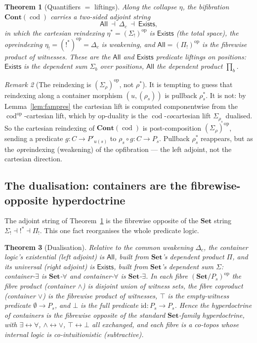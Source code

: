 \documentclass[11pt]{amsart}
\theoremstyle{plain}
\newtheorem{theorem}{Theorem}[section]
\theoremstyle{definition}
\theoremstyle{remark}
\newtheorem{remark}[theorem]{Remark}
\newcommand{\Set}{\mathbf{Set}}
\newcommand{\Cont}{\mathbf{Cont}}
\newcommand{\op}{\mathrm{op}}
\newcommand{\id}{\mathrm{id}}
\newcommand{\prodd}{\textstyle\prod}
\DeclareMathOperator{\cod}{cod}
\newcommand{\Exists}{\mathsf{Exists}}
\newcommand{\All}{\mathsf{All}}
\begin{document}
\begin{theorem}[Quantifiers $=$ liftings]\label{thm:quantAE}
Along the collapse $\eta$, the bifibration $\Cont(\cod)$ carries a two-sided adjoint string
\[
\All\ \dashv\ \Delta_c\ \dashv\ \Exists,
\]
in which the cartesian reindexing $\eta^*=(\Sigma_{!})^\op$ is $\Exists$ (the total space), the
opreindexing $\eta_!=({!}^*)^\op=\Delta_c$ is
weakening, and $\All=(\Pi_{!})^\op$ is the fibrewise product of witnesses. These are the
$\All$ and $\Exists$ predicate liftings on positions: $\Exists$ is the dependent
sum $\Sigma_{b}$ over positions, $\All$ the dependent product $\prodd_{b}$.
\end{theorem}

\begin{remark}[The reindexing is $(\Sigma_\rho)^\op$, not $\rho^*$]\label{rem:trap}
It is tempting to guess that reindexing along a container morphism
$(u,(\rho_s))$ is pullback $\rho_s^*$. It is not: by Lemma~\ref{lem:fampres} the cartesian lift is
computed component\-wise from the $\cod^\op$-cartesian lift, which by op-duality is the
$\cod$-\emph{co}cartesian lift $\Sigma_{\rho_s}$ dualised. So the cartesian reindexing of
$\Cont(\cod)$ is post-composition $(\Sigma_\rho)^\op$, sending a predicate $g\colon C\to P'_{u(s)}$ to
$\rho_s\circ g\colon C\to P_s$. Pullback $\rho_s^*$ reappears, but as the \emph{op}reindexing
(weakening) of the opfibration --- the left adjoint, not the cartesian direction.
\end{remark}

\subsection{The dualisation: containers are the fibrewise-opposite hyperdoctrine}\label{ss:dual}
The adjoint string of Theorem~\ref{thm:quantAE} is the fibrewise opposite of the $\Set$ string
$\Sigma_{!}\dashv{!}^*\dashv\Pi_{!}$. This one fact reorganises the whole predicate logic.

\begin{theorem}[Dualisation]\label{thm:dualisation}
Relative to the common weakening $\Delta_c$, the container logic's existential (left adjoint) is
$\All$, built from $\Set$'s dependent \emph{product} $\Pi$, and its universal (right adjoint) is
$\Exists$, built from $\Set$'s dependent \emph{sum} $\Sigma$: container-$\exists$ is $\Set$-$\forall$
and container-$\forall$ is $\Set$-$\exists$. In each fibre $(\Set/P_s)^\op$ the fibre product
(container $\wedge$) is disjoint union of witness sets, the fibre coproduct (container $\vee$) is the
fibrewise product of witnesses, $\top$ is the empty-witness predicate $\emptyset\to P_s$, and $\bot$
is the full predicate $\id\colon P_s\to P_s$. Hence the hyperdoctrine of containers is the
\emph{fibrewise opposite} of the standard $\Set$-family hyperdoctrine, with $\exists\leftrightarrow
\forall$, $\wedge\leftrightarrow\vee$, $\top\leftrightarrow\bot$ all exchanged, and each fibre is a
\emph{co-topos} whose internal logic is co-intuitionistic (subtractive).
\end{theorem}
\end{document}
